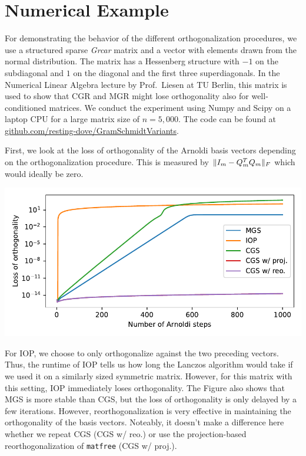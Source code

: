 \documentclass[11pt]{article}
\DeclarePairedDelimiter\norm{\lVert}{\rVert}
\begin{document}
\section{Numerical Example}
For demonstrating the behavior of the different orthogonalization procedures, we use a structured sparse \emph{Grcar} matrix and a vector with elements drawn from the normal distribution.
The matrix has a Hessenberg structure with $-1$ on the subdiagonal and $1$ on the diagonal and the first three superdiagonals.
In the Numerical Linear Algebra lecture by Prof.\ Liesen at TU Berlin, this matrix is used to show that CGR and MGR might lose orthogonality also for well-conditioned matrices.
We conduct the experiment using Numpy and Scipy on a laptop CPU for a large matrix size of $n=5,000$.
The code can be found at \url{github.com/resting-dove/GramSchmidtVariants}.

First, we look at the loss of orthogonality of the Arnoldi basis vectors depending on the orthogonalization procedure.
This is measured by $\norm{I_m - Q_m^T Q_m}_F$ which would ideally be zero.
\begin{center}
    
    \includegraphics[width=\textwidth]{loss_of_orthogonality_grcar}
\end{center}

For IOP, we choose to only orthogonalize against the two preceding vectors.
Thus, the runtime of IOP tells us how long the Lanczos algorithm would take if we used it on a similarly sized symmetric matrix.
However, for this matrix with this setting, IOP immediately loses orthogonality.
The Figure also shows that MGS is more stable than CGS, but the loss of orthogonality is only delayed by a few iterations.
However, reorthogonalization is very effective in maintaining the orthogonality of the basis vectors.
Noteably, it doesn't make a difference here whether we repeat CGS (\textsf{CGS w/ reo.}) or use the projection-based reorthogonalization of \verb|matfree| (\textsf{CGS w/ proj.}).
\end{document}
